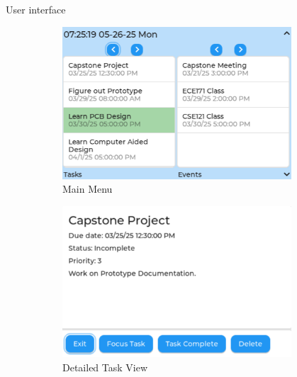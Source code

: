\documentclass[final, cmyk]{beamer}
\newlength{\sepwidth}
\newlength{\colwidth}
\newlength{\bigcolwidth}
\newcommand{\separatorcolumn}{\begin{column}{\sepwidth}\end{column}}
\begin{document}
\begin{frame}[t]
  \begin{columns}
    \separatorcolumn
    \begin{column}{\bigcolwidth}
      \begin{block}{User interface}
        \begin{figure}
          \centering
          \begin{subfigure}{0.24\textwidth}
            \includegraphics[width=\textwidth]{taskEvent.png}
            \caption{Main Menu}
          \end{subfigure}
          \hfill
          \begin{subfigure}{0.24\textwidth}
            \includegraphics[width=\textwidth]{taskTile.png}
            \caption{Detailed Task View}
          \end{subfigure}
          \hfill
          \begin{subfigure}{0.24\textwidth}

\end{subfigure}
\end{figure}
\end{block}
\end{column}
\end{columns}
\end{frame}
\end{document}
